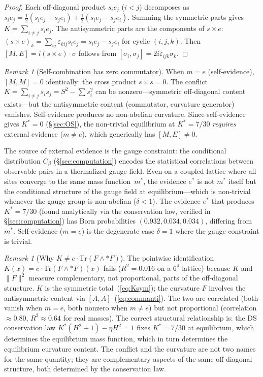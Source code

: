 \documentclass[11pt,a4paper]{article}
\theoremstyle{definition}
\theoremstyle{remark}
\newtheorem{remark}[theorem]{Remark}
\newcommand{\Tr}{\mathrm{Tr}}
\begin{document}
\begin{proof}
Each off-diagonal product $s_ie_j$ ($i<j$) decomposes as $s_ie_j=\tfrac{1}{2}(s_ie_j+s_je_i)+\tfrac{1}{2}(s_ie_j-s_je_i)$. Summing the symmetric parts gives $K=\sum_{i\neq j}s_ie_j$. The antisymmetric parts are the components of $s\times e$: $(s\times e)_k=\sum_{ij}\varepsilon_{kij}s_ie_j=s_ie_j-s_je_i$ for cyclic $(i,j,k)$. Then $[M,E]=i(s\times e)\cdot\sigma$ follows from $[\sigma_i,\sigma_j]=2i\varepsilon_{ijk}\sigma_k$.
\end{proof}

\begin{remark}[Self-combination has zero commutator]\label{rem:selfcomm}
When $m=e$ (self-evidence), $[M,M]=0$ identically: the cross product $s\times s=0$. The conflict $K=\sum_{i\neq j}s_is_j=S^2-\sum s_i^2$ can be nonzero---symmetric off-diagonal content exists---but the antisymmetric content (commutator, curvature generator) vanishes. Self-evidence produces no non-abelian curvature. Since self-evidence gives $K^*=0$ (\S\ref{sec:OS}), the non-trivial equilibrium at $K^*=7/30$ \emph{requires} external evidence ($m\neq e$), which generically has $[M,E]\neq 0$.

The source of external evidence is the gauge constraint: the conditional distribution $C_\beta$ (\S\ref{sec:computation}) encodes the statistical correlations between observable pairs in a thermalized gauge field. Even on a coupled lattice where all sites converge to the same mass function~$m^*$, the evidence $e^*$ is not $m^*$ itself but the conditional structure of the gauge field at equilibrium---which is non-trivial whenever the gauge group is non-abelian ($\delta<1$). The evidence $e^*$ that produces $K^*=7/30$ (found analytically via the conservation law, verified in \S\ref{sec:computation}) has Born probabilities $(0.932, 0.034, 0.034)$, differing from $m^*$. Self-evidence ($m=e$) is the degenerate case $\delta=1$ where the gauge constraint is trivial.
\end{remark}

\begin{remark}[Why $K\neq c\cdot\Tr(F\wedge{*}F)$]\label{rem:KnotF}
The pointwise identification $K(x)=c\cdot\Tr(F\wedge{*}F)(x)$ fails ($R^2=0.016$ on a $6^4$ lattice) because $K$ and $\|F\|^2$ measure complementary, not proportional, parts of the off-diagonal structure. $K$ is the symmetric total~(\ref{eq:Ksym}); the curvature $F$ involves the antisymmetric content via $[A,A]$~(\ref{eq:commanti}). The two are correlated (both vanish when $m=e$, both nonzero when $m\neq e$) but not proportional (correlation $\approx 0.80$, $R^2\approx 0.64$ for real masses). The correct structural relationship is: the DS conservation law $K^*(H^2+1)-\eta H^2=1$ fixes $K^*=7/30$ at equilibrium, which determines the equilibrium mass function, which in turn determines the equilibrium curvature content. The conflict and the curvature are not two names for the same quantity; they are complementary aspects of the same off-diagonal structure, both determined by the conservation law.
\end{remark}
\end{document}
